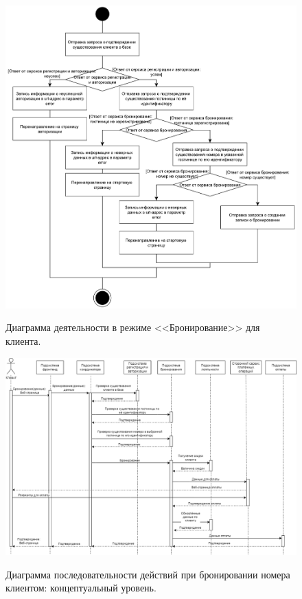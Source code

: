 \begin{figure}[h]
	\begin{center}
		{\includegraphics[scale = 0.58]{img/schemas/schema-1.pdf}}
		\caption{Диаграмма деятельности в режиме <<Бронирование>> для клиента.}
		\label{fig:schema-reservation}
	\end{center}
\end{figure}

\begin{figure}[h]
	\begin{center}
		{\includegraphics[angle = 90, scale = 0.63]{img/flow/diag_general.png}}
		\caption{Диаграмма последовательности действий при бронировании номера клиентом: концептуальный уровень.}
		\label{fig:flow-level1}
	\end{center}
\end{figure}

